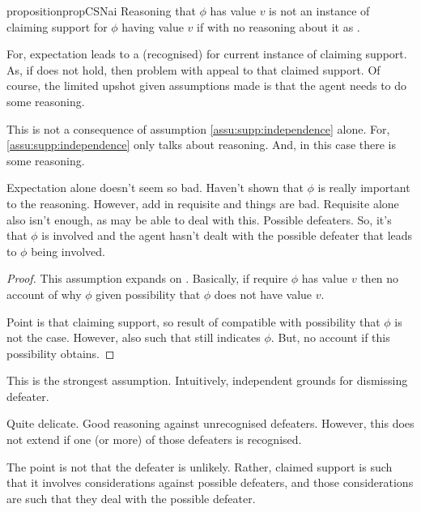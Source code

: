 \begin{note}
  \begin{restatable}{proposition}{propCSNai}\label{prop:CS-nai}
    Reasoning that \(\phi\) has value \(v\) is not an instance of claiming support for \(\phi\) having value \(v\) if \expec{} with no reasoning about it as \expec{}.
  \end{restatable}

  For, expectation leads to a (recognised) \requ{} for current instance of claiming support.
  As, if \expec{} does not hold, then problem with appeal to that claimed support.
  Of course, the limited upshot given assumptions made is that the agent needs to do some reasoning.

  {
    \color{red}
    This is not a consequence of assumption \autoref{assu:supp:independence} alone.
    For, \autoref{assu:supp:independence} only talks about reasoning.
    And, in this case there is some reasoning.
  }
\end{note}

\begin{note}
  Expectation alone doesn't seem so bad.
  Haven't shown that \(\phi\) is really important to the reasoning.
  However, add in requisite and things are bad.
  Requisite alone also isn't enough, as may be able to deal with this.
  Possible defeaters.
  So, it's that \(\phi\) is involved and the agent hasn't dealt with the possible defeater that leads to \(\phi\) being involved.

  \begin{proof}
    This assumption expands on \eiS{}.
    Basically, if require \(\phi\) has value \(v\) then no account of why \(\phi\) given possibility that \(\phi\) does not have value \(v\).

    Point is that claiming support, so result of compatible with possibility that \(\phi\) is not the case.
    However, also such that still indicates \(\phi\).
    But, no account if this possibility obtains.
  \end{proof}

  This is the strongest assumption.
  Intuitively, independent grounds for dismissing defeater.

  Quite delicate.
  Good reasoning against unrecognised defeaters.
  However, this does not extend if one (or more) of those defeaters is recognised.

  The point is not that the defeater is unlikely.
  Rather, claimed support is such that it involves considerations against possible defeaters, and those considerations are such that they deal with the possible defeater.
\end{note}

